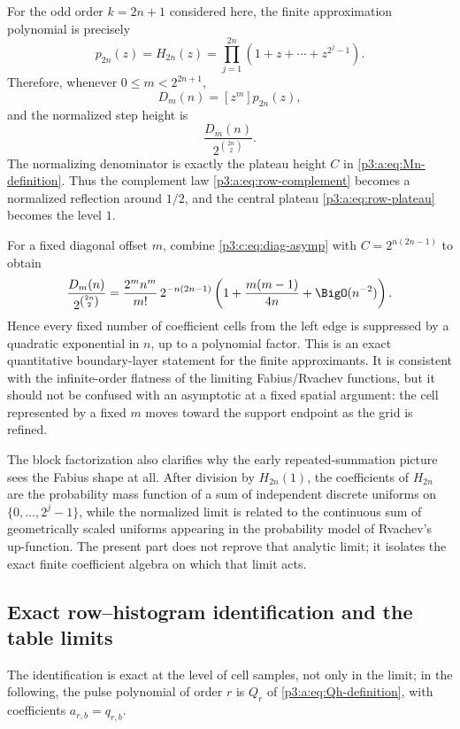 \documentclass[11pt,oneside]{article}
\numberwithin{equation}{section}
\theoremstyle{definition}
\theoremstyle{remark}
\begin{document}
For the odd order $k=2n+1$ considered here, the finite approximation
polynomial is precisely
\begin{equation}
 p_{2n}(z)=H_{2n}(z)
 =\prod_{j=1}^{2n}(1+z+\cdots+z^{2^j-1}).
 \label{p3:b:eq:p-H}
\end{equation}
Therefore, whenever $0\le m<2^{2n+1}$,
\begin{equation}
 D_m(n)=[z^m]p_{2n}(z),
 \label{p3:b:eq:D-approx-coeff}
\end{equation}
and the normalized step height is
\begin{equation}
 \frac{D_m(n)}{2^{\binom{2n}{2}}}.
 \label{p3:b:eq:normalized-edge}
\end{equation}
The normalizing denominator is exactly the plateau height $C$ in
\eqref{p3:a:eq:Mn-definition}.  Thus the complement law
\eqref{p3:a:eq:row-complement} becomes a normalized reflection around $1/2$,
and the central plateau \eqref{p3:a:eq:row-plateau} becomes the level $1$.

For a fixed diagonal offset $m$, combine \eqref{p3:c:eq:diag-asymp} with
$C=2^{n(2n-1)}$ to obtain
\begin{equation}
 \frac{D_m(n)}{2^{\binom{2n}{2}}}
 =\frac{2^mn^m}{m!}\,2^{-n(2n-1)}
 \left(1+\frac{m(m-1)}{4n}+\BigO(n^{-2})\right).
 \label{p3:b:eq:normalized-diagonal-asymptotic}
\end{equation}
Hence every fixed number of coefficient cells from the left edge is
suppressed by a quadratic exponential in $n$, up to a polynomial factor.
This is an exact quantitative boundary-layer statement for the finite
approximants.  It is consistent with the infinite-order flatness of the
limiting Fabius/Rvachev functions, but it should not be confused with an
asymptotic at a fixed spatial argument: the cell represented by a fixed $m$
moves toward the support endpoint as the grid is refined.

The block factorization also clarifies why the early repeated-summation
picture sees the Fabius shape at all.  After division by $H_{2n}(1)$, the coefficients of $H_{2n}$ are the
probability mass function of a sum of independent discrete uniforms on
$\{0,\ldots,2^j-1\}$, while the normalized limit is related to the continuous
sum of geometrically scaled uniforms appearing in the probability model of
Rvachev's up-function.  The present part does not reprove that analytic
limit; it isolates the exact finite coefficient algebra on which that limit
acts.

\subsection{Exact row--histogram identification and the table limits}
The identification is exact at the level of cell samples, not only in the
limit; in the following, the pulse polynomial of order $r$ is $Q_r$ of
\eqref{p3:a:eq:Qh-definition}, with coefficients $a_{r,b}=q_{r,b}$.
\end{document}
